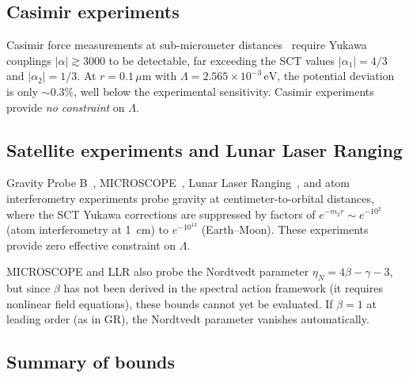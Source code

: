 \documentclass[aps,prd,twocolumn,superscriptaddress,nofootinbib,floatfix]{revtex4-2}
\begin{document}
\subsection{Casimir experiments}

Casimir force measurements at sub-micrometer
distances~\cite{Decca:2007,Chen:2016} require Yukawa couplings
$|\alpha| \gtrsim 3000$ to be detectable, far exceeding the SCT values
$|\alpha_1| = 4/3$ and $|\alpha_2| = 1/3$. At $r = 0.1\,\mu\mathrm{m}$
with $\Lambda = 2.565 \times 10^{-3}\,\mathrm{eV}$, the potential
deviation is only $\sim 0.3\%$, well below the experimental sensitivity.
Casimir experiments provide \emph{no constraint} on $\Lambda$.

\subsection{Satellite experiments and Lunar Laser Ranging}

Gravity Probe B~\cite{Everitt:2011}, MICROSCOPE~\cite{Touboul:2022},
Lunar Laser Ranging~\cite{Williams:2004}, and atom
interferometry experiments probe gravity at centimeter-to-orbital
distances, where the SCT Yukawa corrections are suppressed by factors
of $e^{-m_2 r} \sim e^{-10^{2}}$ (atom interferometry at 1~cm) to
$e^{-10^{13}}$ (Earth--Moon).
These experiments provide zero effective constraint on $\Lambda$.

MICROSCOPE and LLR also probe the Nordtvedt parameter
$\eta_N = 4\beta - \gamma - 3$, but since $\beta$ has not been derived
in the spectral action framework (it requires nonlinear field equations),
these bounds cannot yet be evaluated. If $\beta = 1$ at leading order
(as in GR), the Nordtvedt parameter vanishes automatically.

\subsection{Summary of bounds}
\end{document}
